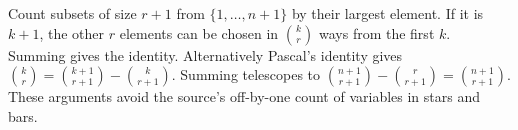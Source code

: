 Count subsets of size $r+1$ from $\{1,\ldots,n+1\}$ by their largest element. If it is $k+1$, the other $r$ elements can be chosen in $\binom kr$ ways from the first $k$. Summing gives the identity. Alternatively Pascal's identity gives $\binom kr=\binom{k+1}{r+1}-\binom k{r+1}$. Summing telescopes to $\binom{n+1}{r+1}-\binom r{r+1}=\binom{n+1}{r+1}$. These arguments avoid the source's off-by-one count of variables in stars and bars.
